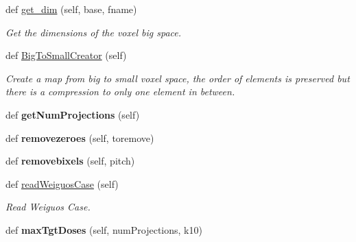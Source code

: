\begin{DoxyCompactItemize}
def \mbox{\hyperlink{classmultiTool_1_1tomodata_a5ee1741b8cee03ef45c948aae95d1a69}{get\+\_\+dim}} (self, base, fname)
\begin{DoxyCompactList}\small\item\em Get the dimensions of the voxel big space. \end{DoxyCompactList}\item 
def \mbox{\hyperlink{classmultiTool_1_1tomodata_ae155fe953b7611fcf0dc7a261761ae15}{Big\+To\+Small\+Creator}} (self)
\begin{DoxyCompactList}\small\item\em Create a map from big to small voxel space, the order of elements is preserved but there is a compression to only one element in between. \end{DoxyCompactList}\item 
\mbox{\label{classmultiTool_1_1tomodata_adacf42bd78e33abfdb2afa77c2088cf3}} 
def {\bfseries get\+Num\+Projections} (self)
\item 
\mbox{\label{classmultiTool_1_1tomodata_a036908561acc8715dbfe4a93a1e90038}} 
def {\bfseries removezeroes} (self, toremove)
\item 
\mbox{\label{classmultiTool_1_1tomodata_adc8f463528343cdd7a6deb9a49b696d5}} 
def {\bfseries removebixels} (self, pitch)
\item 
\mbox{\label{classmultiTool_1_1tomodata_aa5f4559675dc261494a0036aab654d0a}} 
def \mbox{\hyperlink{classmultiTool_1_1tomodata_aa5f4559675dc261494a0036aab654d0a}{read\+Weiguos\+Case}} (self)
\begin{DoxyCompactList}\small\item\em Read Weiguo\textquotesingle{}s Case. \end{DoxyCompactList}\item 
\mbox{\label{classmultiTool_1_1tomodata_a9f2a7d3968b3633bda92aa460556be6a}} 
def {\bfseries max\+Tgt\+Doses} (self, num\+Projections, k10)
\end{DoxyCompactItemize}
